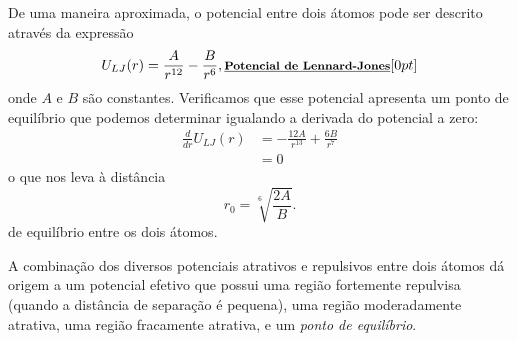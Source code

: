 De uma maneira aproximada, o potencial entre dois átomos pode ser descrito através da expressão
\begin{equation}
    U_{LJ}(r) = \frac{A}{r^{12}} - \frac{B}{r^{6}}, \relax{\footnotesize\emph{\textbf{Potencial de Lennard-Jones}}}[0pt]
\end{equation}
%
onde $A$ e $B$ são constantes. Verificamos que esse potencial apresenta um ponto de equilíbrio que podemos determinar igualando a derivada do potencial a zero:
\begin{align}
    \frac{d}{dr}U_{LJ}(r) &= -\frac{12A}{r^{13}} + \frac{6B}{r^7} \\
    &= 0
\end{align}
%
o que nos leva à distância
\begin{equation}
    r_0 = \sqrt[6]{\frac{2A}{B}}.
\end{equation}
%
de equilíbrio entre os dois átomos.

\begin{marginfigure}[-2cm]
\centering
{}
\caption{A combinação dos diversos potenciais atrativos e repulsivos entre dois átomos dá origem a um potencial efetivo que possui uma região fortemente repulvisa (quando a distância de separação é pequena), uma região moderadamente atrativa, uma região fracamente atrativa, e um \emph{ponto de equilíbrio}. \label{Fig:PotLennardJones}}
\end{marginfigure}

